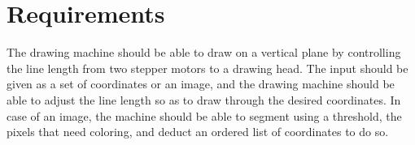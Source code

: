 
\section{Requirements}
The drawing machine should be able to draw on a vertical plane by controlling the line length from two stepper motors to a drawing head. The input should be given as a set of coordinates or an image, and the drawing machine should be able to adjust the line length so as to draw through the desired coordinates. In case of an image, the machine should be able to segment using a threshold, the pixels that need coloring, and deduct an ordered list of coordinates to do so.